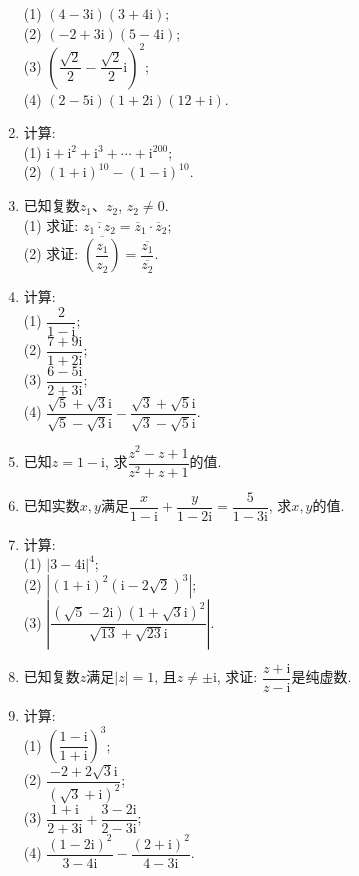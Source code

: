 \documentclass[10pt,a4paper]{article}
\begin{document}
\begin{enumerate}[1.]
(1) $(4-3\mathrm{i})(3+4\mathrm{i})$;\\ 
(2) $(-2+3\mathrm{i})(5-4\mathrm{i})$;\\
(3) $(\dfrac{\sqrt 2}2-\dfrac{\sqrt 2}2\mathrm{i})^2$;\\ 
(4) $(2-5\mathrm{i})(1+2\mathrm{i})(12+\mathrm{i})$.
\item 计算:\\
(1) $\mathrm{i}+\mathrm{i}^2+\mathrm{i}^3+\cdots +\mathrm{i}^{200}$;\\ 
(2) $(1+\mathrm{i})^{10}-(1-\mathrm{i})^{10}$.
\item 已知复数$z_1$、$z_2$, $z_2\ne 0$.\\
(1) 求证: $\overline {z_1\cdot z_2}=\overline z_1\cdot \overline z_2$;\\
(2) 求证: $\overline {(\dfrac{z_1}{z_2})}=\dfrac{\overline {z_1}}{\overline {z_2}}$.
\item 计算:\\
(1) $\dfrac 2{1-\mathrm{i}}$;\\ 
(2) $\dfrac{7+9\mathrm{i}}{1+2\mathrm{i}}$;\\
(3) $\dfrac{6-5\mathrm{i}}{2+3\mathrm{i}}$;\\ 
(4) $\dfrac{\sqrt 5+\sqrt 3\mathrm{i}}{\sqrt 5-\sqrt 3\mathrm{i}}-\dfrac{\sqrt 3+\sqrt 5\mathrm{i}}{\sqrt 3-\sqrt 5\mathrm{i}}$.
\item 已知$z=1-\mathrm{i}$, 求$\dfrac{z^2-z+1}{z^2+z+1}$的值.
\item 已知实数$x,y$满足$\dfrac x{1-\mathrm{i}}+\dfrac y{1-2\mathrm{i}}=\dfrac 5{1-3\mathrm{i}}$, 求$x,y$的值.
\item 计算:\\
(1) $|3-4\mathrm{i}|^4$;\\ 
(2) $|(1+\mathrm{i})^2(\mathrm{i}-2\sqrt 2)^3|$;\\
(3) $|\dfrac{(\sqrt 5-2\mathrm{i}){{(1+\sqrt 3\mathrm{i})}^2}}{\sqrt {13}+\sqrt {23}\mathrm{i}}|$.
\item 已知复数$z$满足$|z|=1$, 且$z\ne \pm \mathrm{i}$, 求证: $\dfrac{z+{\mathrm{i}}}{z-{\mathrm{i}}}$是纯虚数.
\item 计算:\\
(1) $(\dfrac{1-\mathrm{i}}{1+\mathrm{i}})^3$;\\ 
(2) $\dfrac{-2+2\sqrt 3\mathrm{i}}{{{(\sqrt 3+\mathrm{i})}^2}}$;\\
(3) $\dfrac{1+\mathrm{i}}{2+3\mathrm{i}}+\dfrac{3-2\mathrm{i}}{2-3\mathrm{i}}$;\\ 
(4) $\dfrac{{{(1-2\mathrm{i})}^2}}{3-4\mathrm{i}}-\dfrac{{{(2+\mathrm{i})}^2}}{4-3\mathrm{i}}$.

\end{enumerate}
\end{document}
